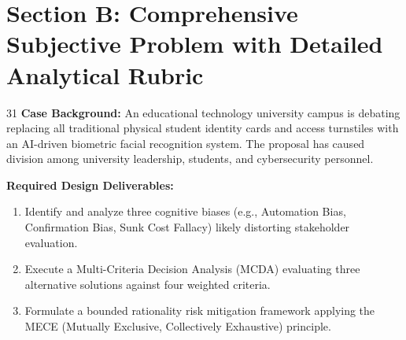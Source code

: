 \newpage
\section{Section B: Comprehensive Subjective Problem with Detailed Analytical Rubric}

\begin{subjectiveq}{3}{1}
\textbf{Case Background:} An educational technology university campus is debating replacing all traditional physical student identity cards and access turnstiles with an AI-driven biometric facial recognition system. The proposal has caused division among university leadership, students, and cybersecurity personnel.

\textbf{Required Design Deliverables:}
\begin{enumerate}[label=(\alph*)]
    \item Identify and analyze three cognitive biases (e.g., Automation Bias, Confirmation Bias, Sunk Cost Fallacy) likely distorting stakeholder evaluation.
    \item Execute a Multi-Criteria Decision Analysis (MCDA) evaluating three alternative solutions against four weighted criteria.
    \item Formulate a bounded rationality risk mitigation framework applying the MECE (Mutually Exclusive, Collectively Exhaustive) principle.
\end{enumerate}
\end{subjectiveq}

